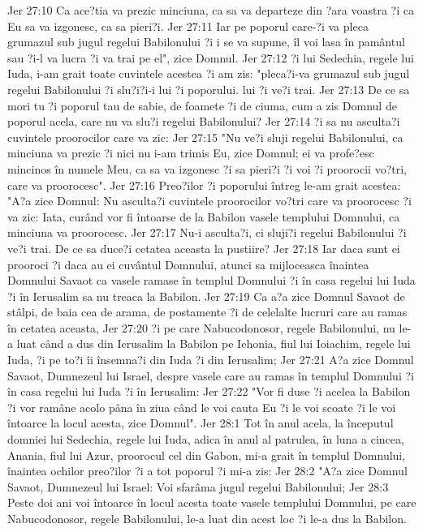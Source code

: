 Jer 27:10  Ca ace?tia va prezic minciuna, ca sa va departeze din ?ara voastra ?i ca Eu sa va izgonesc, ca sa pieri?i.
Jer 27:11  Iar pe poporul care-?i va pleca grumazul sub jugul regelui Babilonului ?i i se va supune, îl voi lasa în pamântul sau ?i-l va lucra ?i va trai pe el", zice Domnul.
Jer 27:12  ?i lui Sedechia, regele lui Iuda, i-am grait toate cuvintele acestea ?i am zis: "pleca?i-va grumazul sub jugul regelui Babilonului ?i slu?i?i-i lui ?i poporului. lui ?i ve?i trai.
Jer 27:13  De ce sa mori tu ?i poporul tau de sabie, de foamete ?i de ciuma, cum a zis Domnul de poporul acela, care nu va slu?i regelui Babilonului?
Jer 27:14  ?i sa nu asculta?i cuvintele proorocilor care va zic:
Jer 27:15  "Nu ve?i sluji regelui Babilonului, ca minciuna va prezic ?i nici nu i-am trimis Eu, zice Domnul; ei va profe?esc mincinos în numele Meu, ca sa va izgonesc ?i sa pieri?i ?i voi ?i proorocii vo?tri, care va proorocesc".
Jer 27:16  Preo?ilor ?i poporului întreg le-am grait acestea: "A?a zice Domnul: Nu asculta?i cuvintele proorocilor vo?tri care va proorocesc ?i va zic: Iata, curând vor fi întoarse de la Babilon vasele templului Domnului, ca minciuna va proorocesc.
Jer 27:17  Nu-i asculta?i, ci sluji?i regelui Babilonului ?i ve?i trai. De ce sa duce?i cetatea aceasta la pustiire?
Jer 27:18  Iar daca sunt ei prooroci ?i daca au ei cuvântul Domnului, atunci sa mijloceasca înaintea Domnului Savaot ca vasele ramase în templul Domnului ?i în casa regelui lui Iuda ?i în Ierusalim sa nu treaca la Babilon.
Jer 27:19  Ca a?a zice Domnul Savaot de stâlpi, de baia cea de arama, de postamente ?i de celelalte lucruri care au ramas în cetatea aceasta,
Jer 27:20  ?i pe care Nabucodonosor, regele Babilonului, nu le-a luat când a dus din Ierusalim la Babilon pe Iehonia, fiul lui Ioiachim, regele lui Iuda, ?i pe to?i îi însemna?i din Iuda ?i din Ierusalim;
Jer 27:21  A?a zice Domnul Savaot, Dumnezeul lui Israel, despre vasele care au ramas în templul Domnului ?i în casa regelui lui Iuda ?i în Ierusalim:
Jer 27:22  "Vor fi duse ?i acelea la Babilon ?i vor ramâne acolo pâna în ziua când le voi cauta Eu ?i le voi scoate ?i le voi întoarce la locul acesta, zice Domnul".
Jer 28:1  Tot în anul acela, la începutul domniei lui Sedechia, regele lui Iuda, adica în anul al patrulea, în luna a cincea, Anania, fiul lui Azur, proorocul cel din Gabon, mi-a grait în templul Domnului, înaintea ochilor preo?ilor ?i a tot poporul ?i mi-a zis:
Jer 28:2  "A?a zice Domnul Savaot, Dumnezeul lui Israel: Voi sfarâma jugul regelui Babilonului;
Jer 28:3  Peste doi ani voi întoarce în locul acesta toate vasele templului Domnului, pe care Nabucodonosor, regele Babilonului, le-a luat din acest loc ?i le-a dus la Babilon.
